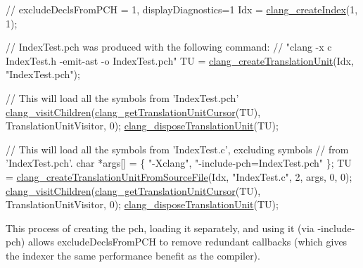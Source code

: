 \begin{DoxyCode}
\textcolor{comment}{// excludeDeclsFromPCH = 1, displayDiagnostics=1}
Idx = \hyperlink{group__CINDEX_ga51eb9b38c18743bf2d824c6230e61f93}{clang\_createIndex}(1, 1);

\textcolor{comment}{// IndexTest.pch was produced with the following command:}
\textcolor{comment}{// "clang -x c IndexTest.h -emit-ast -o IndexTest.pch"}
TU = \hyperlink{group__CINDEX__TRANSLATION__UNIT_ga0659baf7f04381286ec54b439760c8f3}{clang\_createTranslationUnit}(Idx, \textcolor{stringliteral}{"IndexTest.pch"});

\textcolor{comment}{// This will load all the symbols from 'IndexTest.pch'}
\hyperlink{group__CINDEX__CURSOR__TRAVERSAL_ga5d0a813d937e1a7dcc35f206ad1f7a91}{clang\_visitChildren}(\hyperlink{group__CINDEX__CURSOR__MANIP_gaec6e69127920785e74e4a517423f4391}{clang\_getTranslationUnitCursor}(TU),
                    TranslationUnitVisitor, 0);
\hyperlink{group__CINDEX__TRANSLATION__UNIT_gaee753cb0036ca4ab59e48e3dff5f530a}{clang\_disposeTranslationUnit}(TU);

\textcolor{comment}{// This will load all the symbols from 'IndexTest.c', excluding symbols}
\textcolor{comment}{// from 'IndexTest.pch'.}
\textcolor{keywordtype}{char} *args[] = \{ \textcolor{stringliteral}{"-Xclang"}, \textcolor{stringliteral}{"-include-pch=IndexTest.pch"} \};
TU = \hyperlink{group__CINDEX__TRANSLATION__UNIT_gaf45dfbcd2e4d8e9eeab4778f994a74c3}{clang\_createTranslationUnitFromSourceFile}(Idx, \textcolor{stringliteral}{"IndexTest.c"},
       2, args,
                                               0, 0);
\hyperlink{group__CINDEX__CURSOR__TRAVERSAL_ga5d0a813d937e1a7dcc35f206ad1f7a91}{clang\_visitChildren}(\hyperlink{group__CINDEX__CURSOR__MANIP_gaec6e69127920785e74e4a517423f4391}{clang\_getTranslationUnitCursor}(TU),
                    TranslationUnitVisitor, 0);
\hyperlink{group__CINDEX__TRANSLATION__UNIT_gaee753cb0036ca4ab59e48e3dff5f530a}{clang\_disposeTranslationUnit}(TU);
\end{DoxyCode}


This process of creating the \textquotesingle{}pch\textquotesingle{}, loading it separately, and using it (via -\/include-\/pch) allows \textquotesingle{}exclude\+Decls\+From\+P\+CH\textquotesingle{} to remove redundant callbacks (which gives the indexer the same performance benefit as the compiler). \mbox{\label{group__CINDEX_ga21e96379358f2aedc56890f9a35d4125}} 

